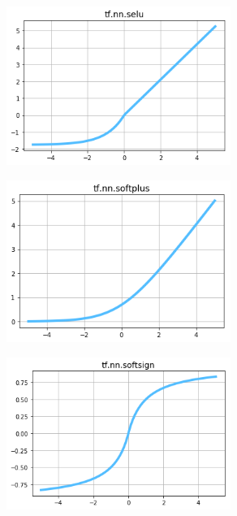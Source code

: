 \begin{figure}
\centering
\includegraphics[width=0.65\textwidth]{./sync_imgs/act/smooth/selu.png}
\label{fig:act_smooth_selu}
\end{figure}

\begin{figure}
\centering
\includegraphics[width=0.65\textwidth]{./sync_imgs/act/smooth/softplus.png}
\label{fig:act_smooth_softplus}
\end{figure}

\begin{figure}
\centering
\includegraphics[width=0.65\textwidth]{./sync_imgs/act/smooth/softsign.png}
\label{fig:act_smooth_softsign}
\end{figure}


